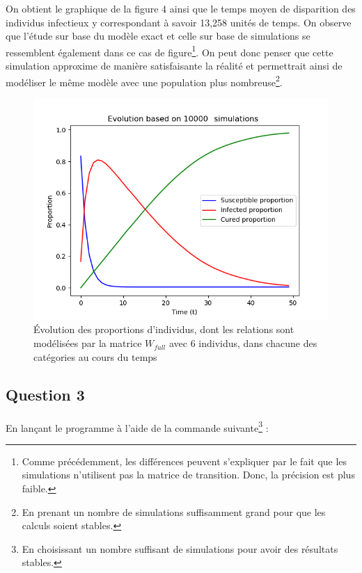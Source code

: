 \documentclass[a4paper, 12pt, oneside]{article}
\begin{document}
\noindent On obtient le graphique de la figure 4 ainsi que le temps moyen de disparition des individus infectieux y correspondant à savoir 13,258 unités de temps. On observe que l'étude sur base du modèle exact et celle sur base de simulations se ressemblent également dans ce cas de figure\footnote{Comme précédemment, les différences peuvent s'expliquer par le fait que les simulations n'utilisent pas la matrice de transition. Donc, la précision est plus faible.}. On peut donc penser que cette simulation approxime de manière satisfaisante la réalité et permettrait ainsi de modéliser le même modèle avec une population plus nombreuse\footnote{En prenant un nombre de simulations suffisamment grand pour que les calculs soient stables.}.

\begin{figure}[H]
	\centering
	\includegraphics[scale=1]{full_6x6_simulations.png} 
	\caption{Évolution des proportions d'individus, dont les relations sont modélisées par la matrice $W_{full}$ avec 6 individus, dans chacune des catégories au cours du temps}
\end{figure}

\subsection{Question 3}

\paragraph{}En lançant le programme à l'aide de la commande suivante\footnote{En choisissant un nombre suffisant de simulations pour avoir des résultats stables.} :
\end{document}
